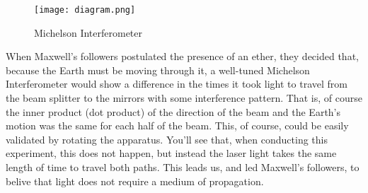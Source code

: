 \documentclass{amsart}
\begin{document}
%
\begin{figure}
    \centering
    \label{interferometer}
    \texttt{[image: diagram.png]}
    \caption{Michelson Interferometer}
\end{figure}

When Maxwell's followers postulated the presence of an ether, they decided that, because the Earth must be moving through it, a well-tuned Michelson Interferometer would show a difference in the times it took light to travel from the beam splitter to the mirrors with some interference pattern. That is, of course the inner product (dot product) of the direction of the beam and the Earth's motion was the same for each half of the beam. This, of course, could be easily validated by rotating the apparatus. You'll see that, when conducting this experiment, this does not happen, but instead the laser light takes the same length of time to travel both paths. This leads us, and led Maxwell's followers, to belive that light does not require a medium of propagation.
\end{document}
